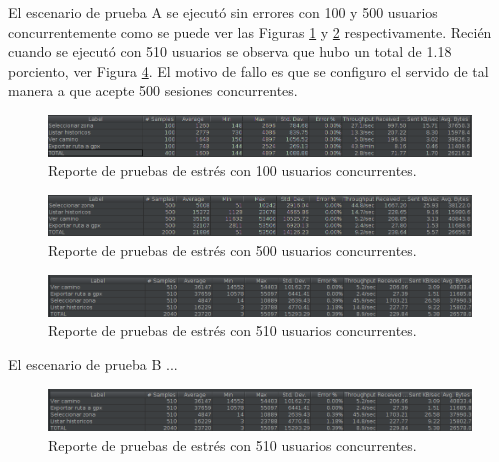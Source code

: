 El escenario de prueba A se ejecutó sin errores con 100 y 500 usuarios concurrentemente como se puede ver las Figuras \ref{fig:100UsuariosEstresA} y \ref{fig:500UsuariosEstresA} respectivamente. Recién cuando se ejecutó con 510 usuarios se observa que hubo un total de 1.18 porciento, ver Figura \ref{fig:510UsuariosEstresA}. El motivo de fallo es que se configuro el servido de tal manera a que acepte 500 sesiones concurrentes.

\begin{figure}[H]
    \centering
    \includegraphics[width=\textwidth]{100_usuarios_sin_optimizacion_editado.png}
    \caption{Reporte de pruebas de estrés con 100 usuarios concurrentes.}
    \label{fig:100UsuariosEstresA}
\end{figure}

\begin{figure}[H]
    \centering
    \includegraphics[width=\textwidth]{500_usuarios_sin_optimizacion_editado.png}
    \caption{Reporte de pruebas de estrés con 500 usuarios concurrentes.}
    \label{fig:500UsuariosEstresA}
\end{figure}

\begin{figure}[H]
    \centering
    \includegraphics[width=\textwidth]{510_usuarios_sin_optimizacion_editado.png}
    \caption{Reporte de pruebas de estrés con 510 usuarios concurrentes.}
    \label{fig:510UsuariosEstresA}
\end{figure}

El escenario de prueba B ...

\begin{figure}[H]
    \centering
    \includegraphics[width=\textwidth]{510_usuarios_sin_optimizacion_editado.png}
    \caption{Reporte de pruebas de estrés con 510 usuarios concurrentes.}
    \label{fig:510UsuariosEstresA}
\end{figure}

